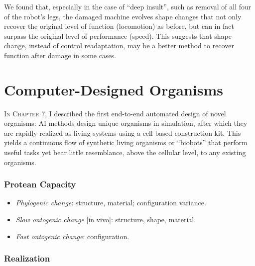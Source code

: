 We found that, especially in the case of ``deep insult'', such as removal of all four of the robot's legs, the damaged machine evolves shape changes that not only recover the original level of function (locomotion) as before, but can in fact surpass the original level of performance (speed).
This suggests that shape change, instead of control readaptation, may be a better method to recover function after damage in some cases.





\section{Computer-Designed Organisms}


\textsc{In Chapter 7,}
I described the first end-to-end automated design of novel organisms: AI methods design unique organisms in simulation, after which they are rapidly realized as living systems using a cell-based construction kit. 
This yields a continuous flow of synthetic living organisms or ``biobots'' that perform useful tasks yet bear little resemblance, above the cellular level, to any existing organisms. 



\subsubsection*{Protean Capacity}

\begin{itemize}
    \item \textit{Phylogenic change}: structure, material; configuration variance.
    \item \textit{Slow ontogenic change} [in vivo]: structure, shape, material.
    \item \textit{Fast ontogenic change}: configuration.
\end{itemize}


\subsubsection*{Realization}

